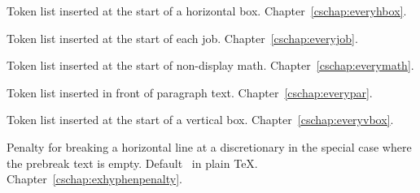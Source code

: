 \begin{glossinventory}
\item [\cs{everyhbox}]
      Token list inserted at the start of a horizontal box.
Chapter~\ref{cschap:everyhbox}.

\item [\cs{everyjob}]
      Token list inserted at the start of each job.
Chapter~\ref{cschap:everyjob}.

\item [\cs{everymath}]
      Token list inserted at the start of non-display math.
Chapter~\ref{cschap:everymath}.

\item [\cs{everypar}]
      Token list inserted in front of paragraph text.
Chapter~\ref{cschap:everypar}.

\item [\cs{everyvbox}]
      Token list inserted at the start of a vertical box.
Chapter~\ref{cschap:everyvbox}.

\item [\cs{exhyphenpenalty}]
      Penalty for breaking a horizontal line at a discretionary
      in the special case where the prebreak text is empty. 
      Default~ in plain \TeX.
Chapter~\ref{cschap:exhyphenpenalty}.


\end{glossinventory}

